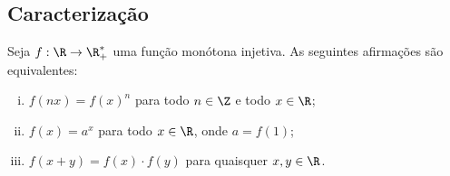 \subsection{Caracterização}

\begin{theorem}
Seja $f: \R \to \R_+^*$ uma função monótona injetiva. As
seguintes afirmações são equivalentes:
\begin{enumerate}[(i)]
  \item $f(nx) = f(x)^n$ para todo $n \in \Z$ e todo $x \in \R$;
  \item $f(x) = a^x$ para todo $x\in \R$, onde $a = f(1)$;
  \item $f(x+y) = f(x)\cdot f(y)$ para quaisquer $x, y \in \R$.
\end{enumerate}
\end{theorem}